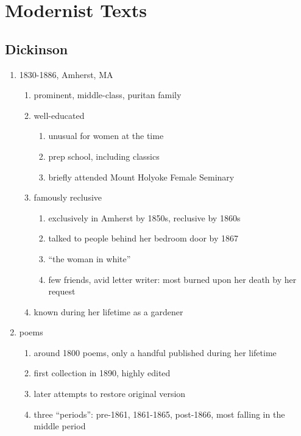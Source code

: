 \documentclass[12pt]{article}
\begin{document}
\newpage

\section{Modernist Texts}

\subsection{Dickinson}

\begin{enumerate}
\item 1830-1886, Amherst, MA
    \begin{enumerate}
    \item prominent, middle-class, puritan family
    \item well-educated
        \begin{enumerate}
        \item unusual for women at the time
        \item prep school, including classics
        \item briefly attended Mount Holyoke Female Seminary
        \end{enumerate}
    \item famously reclusive
        \begin{enumerate}
        \item exclusively in Amherst by 1850s, reclusive by 1860s
        \item talked to people behind her bedroom door by 1867
        \item ``the woman in white''
        \item few friends, avid letter writer: most burned upon her death by her request
        \end{enumerate}
    \item known during her lifetime as a gardener
    \end{enumerate}
\item poems
    \begin{enumerate}
    \item around 1800 poems, only a handful published during her lifetime
    \item first collection in 1890, highly edited
    \item later attempts to restore original version
    \item three ``periods'': pre-1861, 1861-1865, post-1866, most falling in the middle period
    \end{enumerate}

\end{enumerate}
\end{document}
